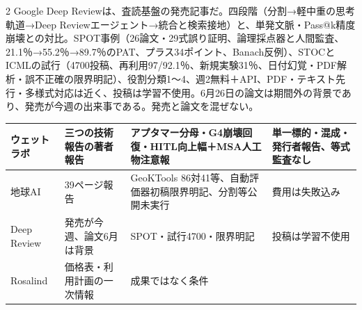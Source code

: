 \documentclass[lualatex,a4paper,10pt]{jlreq}
\begin{document}
\begin{multicols}{2}
Google Deep Reviewは、査読基盤の発売記事だ。四段階（分割→軽中重の思考軌道→Deep Reviewエージェント→統合と検索接地）と、単発文脈・Pass@k精度崩壊との対比。SPOT事例（26論文・29式誤り証明、論理採点器と人間監査、21.1％→55.2％→89.7％のPAT、プラス34ポイント、Banach反例）、STOCとICMLの試行（4700投稿、再利用97/92.1％、新規実験31％、日付幻覚・PDF解析・誤不正確の限界明記）、役割分類1〜4、週2無料＋API、PDF・テキスト先行・多様式対応は近く、投稿は学習不使用。6月26日の論文は期間外の背景であり、発売が今週の出来事である。発売と論文を混ぜない。
\cite{B50,B85,B49}


\end{multicols} %

{\centering\footnotesize
{}
\begin{tabularx}{0.96\linewidth}{@{}lXXX@{}}
\toprule
ウェットラボ & 三つの技術報告の著者報告 & アプタマー分母・G4崩壊回復・HITL向上幅＋MSA人工物注意報 & 単一標的・混成・発行者報告、等式監査なし \cite{B46,B83,B44,B43} \\
\midrule
地球AI & 39ページ報告 & GeoKTools 86対41等、自動評価器初稿限界明記、分割等公開未実行 & 費用は失敗込み \cite{B47,B84,B48} \\
\midrule
Deep Review & 発売が今週、論文6月は背景 & SPOT・試行4700・限界明記 & 投稿は学習不使用 \cite{B50,B85,B49} \\
\midrule
Rosalind & 価格表・利用計画の一次情報 & 成果ではなく条件 \cite{B51,B86} \\
\bottomrule
\end{tabularx}
} %
\end{document}
